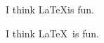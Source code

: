 \documentclass{article}
\begin{document}
  I think \LaTeX is fun.

  I think \LaTeX\ is fun.
  
\end{document}
